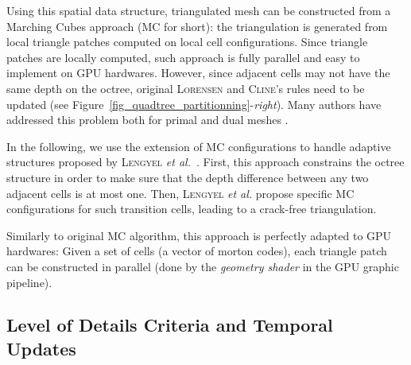 \documentclass{llncs}
\begin{document}
Using this spatial data structure, triangulated mesh can be constructed
from a Marching Cubes approach \cite{lorensen1987marching} (MC for short): the
triangulation is generated from local triangle patches computed on
local cell configurations. Since triangle patches are locally
computed, such approach is fully parallel and easy to implement on GPU
hardwares. However, since adjacent cells may not have the same depth
on the octree, original \textsc{Lorensen} and \textsc{Cline}'s rules need to be
updated (see Figure~\ref{fig_quadtree_partitionning}-\emph{right}). Many authors have addressed this problem both for primal and
dual meshes
\cite{shu1995adaptive,schaefer2004dual,lengyel2010voxel,DBLP:journals/cgf/LewinerMPPL10,DBLP:journals/cvgip/LobelloDD14}.

In the following, we use the extension of MC configurations to handle
adaptive structures proposed by \textsc{Lengyel} \emph{et al.}~\cite{lengyel2010voxel}. First, this approach constrains the octree
structure in order to make sure that the depth difference between any
two adjacent cells is at most one. Then, \textsc{Lengyel} \emph{et al.} propose
specific MC configurations for such transition cells,  leading to a
crack-free triangulation.

Similarly to original MC algorithm, this approach is perfectly adapted
to GPU hardwares: Given a set of cells (a vector of morton codes),
each triangle patch can be constructed in parallel (done by
the \emph{geometry shader} in the GPU graphic pipeline).

\subsection{Level of Details Criteria and Temporal Updates}
\end{document}
